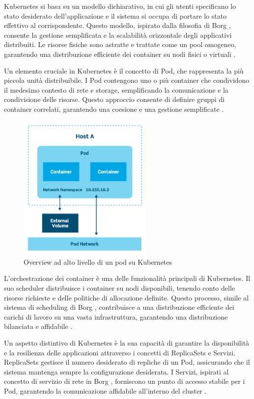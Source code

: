 Kubernetes si basa su un modello dichiarativo, in cui gli utenti specificano lo stato desiderato dell'applicazione e il sistema si occupa di portare lo stato effettivo al corrispondente. Questo modello, ispirato dalla filosofia di Borg \cite{verma2015large}, consente la gestione semplificata e la scalabilità orizzontale degli applicativi distribuiti. Le risorse fisiche sono astratte e trattate come un pool omogeneo, garantendo una distribuzione efficiente dei container su nodi fisici o virtuali \cite{burns2016borg}.

Un elemento cruciale in Kubernetes è il concetto di Pod, che rappresenta la più piccola unità distribuibile. I Pod contengono uno o più container che condividono il medesimo contesto di rete e storage, semplificando la comunicazione e la condivisione delle risorse. Questo approccio consente di definire gruppi di container correlati, garantendo una coesione e una gestione semplificate \cite{burns2016borg}.

\begin{figure}[h]
    \centering
    \includegraphics[width=250px]{figures/ch3/kube-pod.jpg}
    \caption[Overview ad alto livello di un pod su Kubernetes]{Overview ad alto livello di un pod su Kubernetes}
    \label{fig:cha3:k8s2}
\end{figure}

L'orchestrazione dei container è una delle funzionalità principali di Kubernetes. Il suo scheduler distribuisce i container su nodi disponibili, tenendo conto delle risorse richieste e delle politiche di allocazione definite. Questo processo, simile al sistema di scheduling di Borg \cite{burns2016borg}, contribuisce a una distribuzione efficiente dei carichi di lavoro su una vasta infrastruttura, garantendo una distribuzione bilanciata e affidabile \cite{burns2016borg}.

Un aspetto distintivo di Kubernetes è la sua capacità di garantire la disponibilità e la resilienza delle applicazioni attraverso i concetti di ReplicaSets e Servizi. ReplicaSets gestisce il numero desiderato di repliche di un Pod, assicurando che il sistema mantenga sempre la configurazione desiderata. I Servizi, ispirati al concetto di servizio di rete in Borg \cite{verma2015large}, forniscono un punto di accesso stabile per i Pod, garantendo la comunicazione affidabile all'interno del cluster \cite{burns2016borg}.


